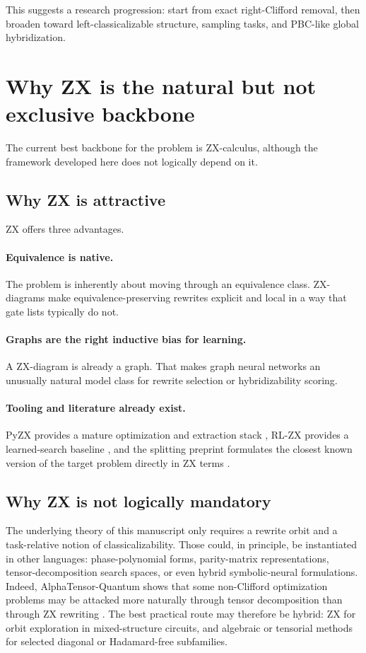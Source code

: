 \documentclass[11pt]{article}
\theoremstyle{remark}
\begin{document}
This suggests a research progression: start from exact right-Clifford removal, then broaden toward left-classicalizable structure, sampling tasks, and PBC-like global hybridization.

\section{Why ZX is the natural but not exclusive backbone}

The current best backbone for the problem is ZX-calculus, although the framework developed here does not logically depend on it.

\subsection{Why ZX is attractive}

ZX offers three advantages.

\paragraph{Equivalence is native.}
The problem is inherently about moving through an equivalence class. ZX-diagrams make equivalence-preserving rewrites explicit and local in a way that gate lists typically do not.

\paragraph{Graphs are the right inductive bias for learning.}
A ZX-diagram is already a graph. That makes graph neural networks an unusually natural model class for rewrite selection or hybridizability scoring.

\paragraph{Tooling and literature already exist.}
PyZX provides a mature optimization and extraction stack \cite{pyzx_2020}, RL-ZX provides a learned-search baseline \cite{rlzx_2025}, and the splitting preprint formulates the closest known version of the target problem directly in ZX terms \cite{splitting_2025}.

\subsection{Why ZX is not logically mandatory}

The underlying theory of this manuscript only requires a rewrite orbit and a task-relative notion of classicalizability. Those could, in principle, be instantiated in other languages: phase-polynomial forms, parity-matrix representations, tensor-decomposition search spaces, or even hybrid symbolic-neural formulations. Indeed, AlphaTensor-Quantum shows that some non-Clifford optimization problems may be attacked more naturally through tensor decomposition than through ZX rewriting \cite{alphatensor_2025}. The best practical route may therefore be hybrid: ZX for orbit exploration in mixed-structure circuits, and algebraic or tensorial methods for selected diagonal or Hadamard-free subfamilies.
\end{document}
